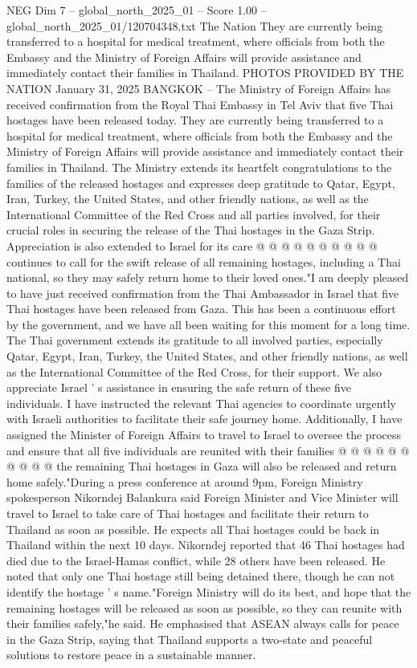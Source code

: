 \begin{textsample}{NEG Dim 7 – global\_north\_2025\_01 – Score 1.00 – global\_north\_2025\_01/120704348.txt}  \label{ex:f7_neg_189}
The Nation They are currently being transferred to a hospital for medical treatment, where officials from both the Embassy and the Ministry of Foreign Affairs will provide assistance and immediately contact their families in Thailand.
PHOTOS PROVIDED BY THE NATION January 31, 2025 BANGKOK -- The Ministry of Foreign Affairs has received confirmation from the Royal Thai Embassy in Tel Aviv that five Thai hostages have been released today.
They are currently being transferred to a hospital for medical treatment, where officials from both the Embassy and the Ministry of Foreign Affairs will provide assistance and immediately contact their families in Thailand.
The Ministry extends its heartfelt congratulations to the families of the released hostages and expresses deep gratitude to Qatar, Egypt, Iran, Turkey, the United States, and other friendly nations, as well as the International Committee of the Red Cross and all parties involved, for their crucial roles in securing the release of the Thai hostages in the Gaza Strip.
Appreciation is also extended to Israel for its care @ @ @ @ @ @ @ @ @ @ continues to call for the swift release of all remaining hostages, including a Thai national, so they may safely return home to their loved ones."I am deeply pleased to have just received confirmation from the Thai Ambassador in Israel that five Thai hostages have been released from Gaza.
This has been a continuous effort by the government, and we have all been waiting for this moment for a long time.
The Thai government extends its gratitude to all involved parties, especially Qatar, Egypt, Iran, Turkey, the United States, and other friendly nations, as well as the International Committee of the Red Cross, for their support.
We also appreciate Israel ' s assistance in ensuring the safe return of these five individuals.
I have instructed the relevant Thai agencies to coordinate urgently with Israeli authorities to facilitate their safe journey home.
Additionally, I have assigned the Minister of Foreign Affairs to travel to Israel to oversee the process and ensure that all five individuals are reunited with their families @ @ @ @ @ @ @ @ @ @ the remaining Thai hostages in Gaza will also be released and return home safely."During a press conference at around 9pm, Foreign Ministry spokesperson Nikorndej Balankura said Foreign Minister and Vice Minister will travel to Israel to take care of Thai hostages and facilitate their return to Thailand as soon as possible.
He expects all Thai hostages could be back in Thailand within the next 10 days.
Nikorndej reported that 46 Thai hostages had died due to the Israel-Hamas conflict, while 28 others have been released.
He noted that only one Thai hostage still being detained there, though he can not identify the hostage ' s name."Foreign Ministry will do its best, and hope that the remaining hostages will be released as soon as possible, so they can reunite with their families safely,"he said.
He emphasised that ASEAN always calls for peace in the Gaza Strip, saying that Thailand supports a two-state and peaceful solutions to restore peace in a sustainable manner.

\end{textsample}
